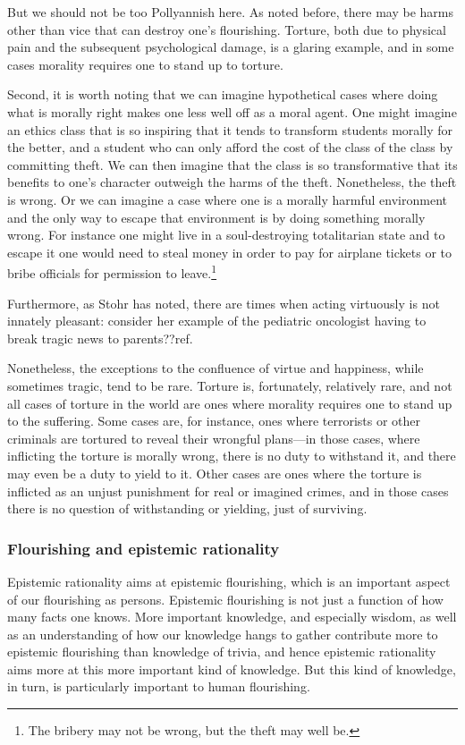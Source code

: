 But we should not be too Pollyannish here. As noted before, there may 
be harms other than vice that can destroy one's flourishing. Torture, both due to physical pain and the subsequent 
psychological damage, is a glaring example, and in some cases morality requires one to stand up to torture. 

Second, it is worth noting that we can imagine hypothetical cases where doing what is morally right makes one less 
well off as a moral agent. One might imagine an ethics class that is so inspiring that it tends to 
transform students morally for the better, and a student who can only afford the cost of the class of the class by 
committing theft. We can then imagine that the class is so transformative that its benefits to one's character outweigh
the harms of the theft. Nonetheless, the theft is wrong. Or we can imagine a case where one is a morally harmful 
environment and the only way to escape that environment is by doing something morally wrong. For instance one might 
live in a soul-destroying totalitarian state and to escape it one would need to steal money in order to pay for airplane 
tickets or to bribe officials for permission to leave.\footnote{The bribery may not be wrong, but the theft may well be.}

Furthermore, as Stohr has noted, there are times when acting virtuously is not innately pleasant: consider her 
example of the pediatric oncologist having to break tragic news to parents??ref. 

Nonetheless, the exceptions to the confluence of virtue and happiness, while sometimes tragic, tend to be rare. 
Torture is, fortunately, relatively rare, and not all cases of torture in the world are ones where morality requires 
one to stand up to the suffering. Some cases are, for instance, ones where terrorists or other criminals are tortured
to reveal their wrongful plans---in those cases, where inflicting the torture is morally wrong, there is no duty to 
withstand it, and there may even be a duty to yield to it. Other cases are ones where the torture is inflicted 
as an unjust punishment for real or imagined crimes, and in those cases there is no question of withstanding or 
yielding, just of surviving.

\subsubsection{Flourishing and epistemic rationality}
Epistemic rationality aims at epistemic flourishing, which is an important aspect of our flourishing as persons.
Epistemic flourishing is not just a function of how many facts one knows. More important knowledge, and especially
wisdom, as well as an understanding of how our knowledge hangs to gather contribute more to epistemic flourishing 
than knowledge of trivia, and hence epistemic rationality aims more at this more important kind of knowledge. But 
this kind of knowledge, in turn, is particularly important to human flourishing.

